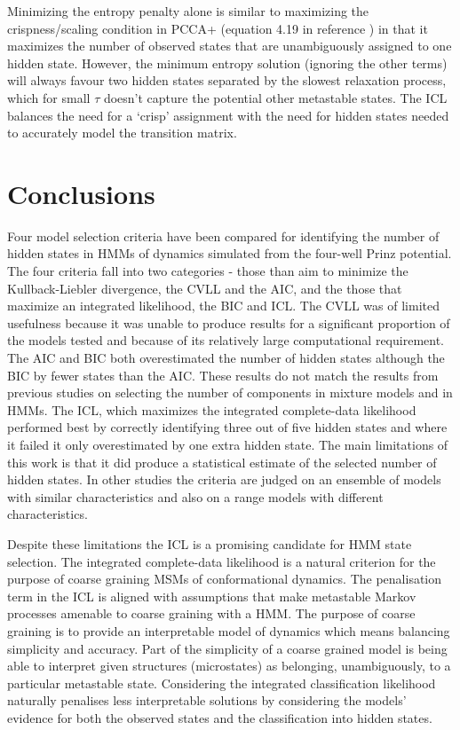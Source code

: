 Minimizing the entropy penalty alone is similar to maximizing the crispness/scaling condition in PCCA+ (equation 4.19 in reference \cite{deuflhardRobustPerronCluster2005b}) in that it maximizes the number of  observed states that are unambiguously assigned to one hidden state. However, the minimum entropy solution (ignoring the other terms) will always favour two hidden states separated by the slowest relaxation process, which for small $\tau$ doesn't capture the potential other metastable states. The ICL balances the need for a `crisp' assignment with the need for hidden states needed to accurately  model the transition matrix. 

\section{Conclusions}\label{sec:hmm_conclusions}
Four model selection criteria have been compared for identifying the number of hidden states in HMMs of dynamics simulated from the four-well Prinz potential. The four criteria fall into two categories - those than aim to minimize the Kullback-Liebler divergence, the CVLL and the AIC, and the those that maximize an integrated likelihood, the BIC and ICL. The CVLL was of limited usefulness because it was unable to produce results for a significant proportion of the models tested and because of its relatively large computational requirement. The AIC and BIC both overestimated the number of hidden states although the BIC by fewer states than the AIC. These results do not match the results from previous studies on selecting the number of components in mixture models and in HMMs. The ICL, which maximizes the integrated complete-data likelihood performed best by correctly identifying three out of five hidden states and where it failed it only overestimated by one extra hidden state. The main limitations of this work is that it did produce a statistical estimate of the selected number of hidden states. In other studies\cite{biernackiAssessingMixtureModel2000a} the criteria are judged on an ensemble of models with similar characteristics and also on a range models with different characteristics.  

Despite these limitations the ICL is a promising candidate for HMM state selection. The integrated complete-data likelihood is a natural criterion for the purpose of coarse graining  MSMs of conformational dynamics. The penalisation term in the ICL is aligned with assumptions that make metastable Markov processes amenable to coarse graining with a HMM. The purpose of coarse graining is to provide an interpretable model of dynamics which means balancing simplicity and accuracy. Part of the simplicity of a coarse grained model is being able to interpret given structures (microstates) as belonging, unambiguously, to a particular metastable state. Considering the integrated classification likelihood naturally penalises less interpretable solutions by considering the models' evidence for both the observed states and the classification into hidden states. 




